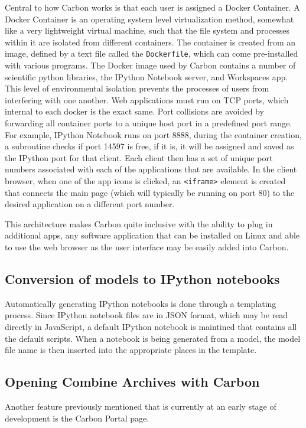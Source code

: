 Central to how Carbon works is that each user is assigned a Docker Container.
A Docker Container is an operating system level virtualization method, somewhat like a very lightweight virtual machine, such that the file system and processes within it are isolated from different containers.
The container is created from an image, defined by a text file called the \texttt{Dockerfile}, which can come pre-installed with various programs.
The Docker image used by Carbon contains a number of scientific python libraries, the IPython Notebook server, and Workspaces app.
This level of environmental isolation prevents the processes of users from interfering with one another.
Web applications must run on TCP ports, which internal to each docker is the exact same.
Port collisions are avoided by forwarding all container ports to a unique host port in a predefined port range.
For example, IPython Notebook runs on port 8888, during the container creation, a subroutine checks if port 14597 is free, if it is, it will be assigned and saved as the IPython port for that client.
Each client then has a set of unique port numbers associated with each of the applications that are available.
In the client browser, when one of the app icons is clicked, an \texttt{<iframe>} element is created that connects the main page (which will typically be running on port 80) to the desired application on a different port number.

This architecture makes Carbon quite inclusive with the ability to plug in additional apps, any software application that can be installed on Linux and able to use the web browser as the user interface may be easily added into Carbon.

\subsection{Conversion of models to IPython notebooks}

Automatically generating IPython notebooks is done through a templating process.
Since IPython notebook files are in JSON format, which may be read directly in JavaScript, a default IPython notebook is maintined that contains all the default scripts.
When a notebook is being generated from a model, the model file name is then inserted into the appropriate places in the template.

\subsection{Opening Combine Archives with Carbon}
Another feature previously mentioned that is currently at an early stage of development is the Carbon Portal page.


